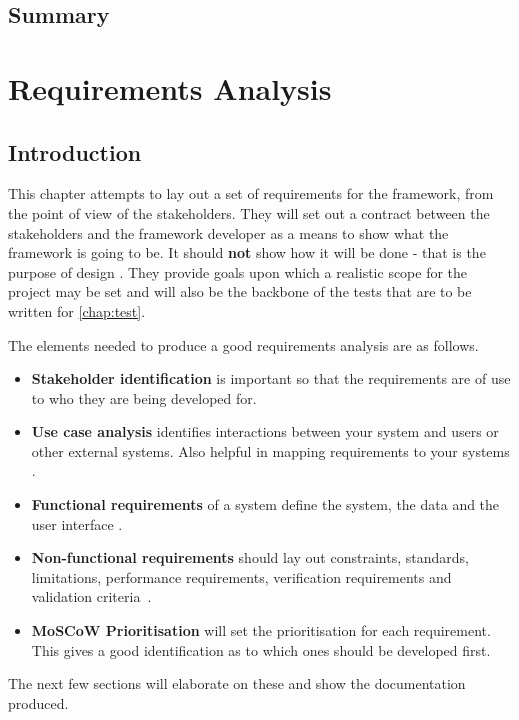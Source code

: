 \documentclass[11pt,oneside]{report}
\begin{document}
				\section{Summary}
	\chapter{Requirements Analysis}\label{chap:req}
	\section{Introduction}
	This chapter attempts to lay out a set of requirements for the framework, from the point of view of the stakeholders.
	They will set out a contract between the stakeholders and the framework developer as a means to show what the framework is going to be. It should \textbf{not} show how it will be done - that is the purpose of design \cite{book:dawson}.
	They provide goals upon which a realistic scope for the project may be set and will also be the backbone of the tests that are to be written for \autoref{chap:test}.
	
	The elements needed to produce a good requirements analysis are as follows.
	\begin{itemize}
		\item \textbf{Stakeholder identification} is important so that the requirements are of use to who they are being developed for.
		\item \textbf{Use case analysis} identifies interactions between your system and users or other external systems. Also helpful in mapping requirements to your systems \cite{book:uml}.
		\item \textbf{Functional requirements} of a system define the system, the data and the user interface \cite{book:dawson}.
		\item \textbf{Non-functional requirements} should lay out constraints, standards, limitations, performance requirements, verification requirements and validation criteria~\cite{book:dawson}.
		\item \textbf{MoSCoW Prioritisation} will set the prioritisation for each requirement. This gives a good identification as to which ones should be developed first.
	\end{itemize}
	The next few sections will elaborate on these and show the documentation produced. 
		
\end{document}
